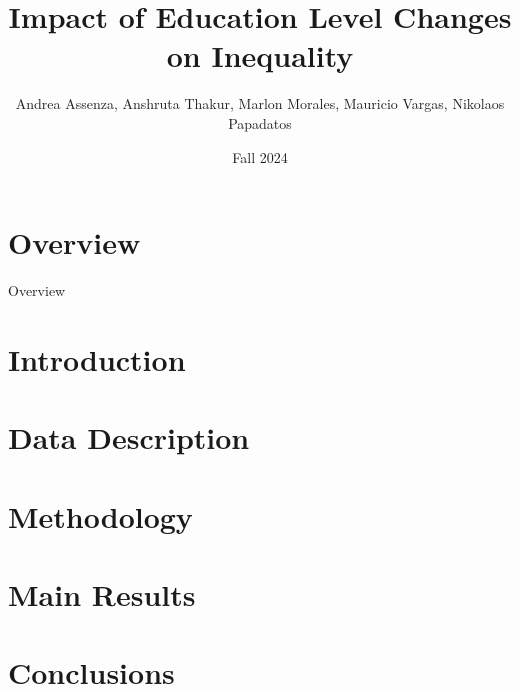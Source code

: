 \documentclass[8pt]{beamer}
\title{Impact of Education Level Changes on Inequality}
\date{Fall 2024}
\author{
    Andrea Assenza,
    Anshruta Thakur,
    Marlon Morales,
    Mauricio Vargas,
    Nikolaos Papadatos
}
\begin{document}
\insertTitleSlide

\section{Overview}
\label{section:overview}
\begin{frame}{Overview}
    \tableofcontents
\end{frame}

\section{Introduction}
    

\section{Data Description}
    

\section{Methodology}
    

\section{Main Results}
    

\section{Conclusions}
    


\insertLastSlide
\end{document}
